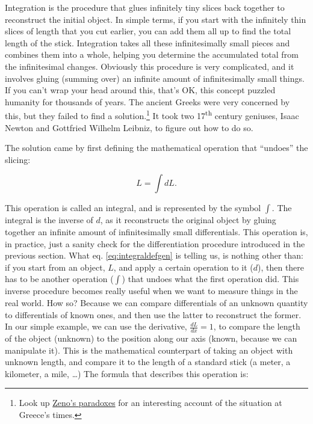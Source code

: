 \documentclass[
  9pt,
]{extbook}
\theoremstyle{definition}
\theoremstyle{definition}
\theoremstyle{definition}
\theoremstyle{definition}
\theoremstyle{remark}
\begin{document}
Integration is the procedure that glues infinitely tiny slices back together to reconstruct the initial object. In simple terms, if you start with the infinitely thin slices of length that you cut earlier, you can add them all up to find the total length of the stick. Integration takes all these infinitesimally small pieces and combines them into a whole, helping you determine the accumulated total from the infinitesimal changes. Obviously this procedure is very complicated, and it involves gluing (summing over) an infinite amount of infinitesimally small things. If you can't wrap your head around this, that's OK, this concept puzzled humanity for thousands of years. The ancient Greeks were very concerned by this, but they failed to find a solution.\footnote{Look up \href{https://en.wikipedia.org/wiki/Zeno\%27s_paradoxes}{Zeno's paradoxes} for an interesting account of the situation at Greece's times.} It took two 17\textsuperscript{th} century geniuses, Isaac Newton and Gottfried Wilhelm Leibniz, to figure out how to do so.

The solution came by first defining the mathematical operation that ``undoes'' the slicing:

\begin{equation}
L = \int dL.
\label{eq:integraldefgen}
\end{equation}

This operation is called an integral, and is represented by the symbol \(\int\). The integral is the inverse of \(d\), as it reconstructs the original object by gluing together an infinite amount of infinitesimally small differentials. This operation is, in practice, just a sanity check for the differentiation procedure introduced in the previous section. What eq. \eqref{eq:integraldefgen} is telling us, is nothing other than: if you start from an object, \(L\), and apply a certain operation to it (\(d\)), then there has to be another operation (\(\int\)) that undoes what the first operation did. This inverse procedure becomes really useful when we want to measure things in the real world. How so? Because we can compare differentials of an unknown quantity to differentials of known ones, and then use the latter to reconstruct the former. In our simple example, we can use the derivative, \(\frac{dL}{dx}=1\), to compare the length of the object (unknown) to the position along our axis (known, because we can manipulate it). This is the mathematical counterpart of taking an object with unknown length, and compare it to the length of a standard stick (a meter, a kilometer, a mile, \ldots) The formula that describes this operation is:
\end{document}
